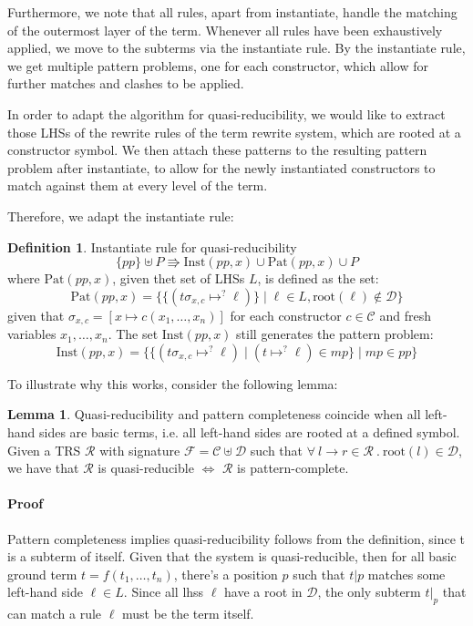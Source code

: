 \documentclass{report}
\theoremstyle{definition}
\newtheorem{lemma_inner}{Lemma}
\newenvironment{lemma}
  {\begin{customblock}\begin{lemma_inner}}
  {\end{lemma_inner}\end{customblock}}
\newtheorem{definition_inner}{Definition}
\newenvironment{definition}
  {\begin{customblock}\begin{definition_inner}}
  {\end{definition_inner}\end{customblock}}
\begin{document}
Furthermore, we note that all rules, apart from instantiate, handle the matching of the outermost layer of the term. Whenever all rules have been exhaustively applied, we move to the subterms via the instantiate rule. By the instantiate rule, we get multiple pattern problems, one for each constructor, which allow for further matches and clashes to be applied.

In order to adapt the algorithm for quasi-reducibility, we would like to extract those LHSs of the rewrite rules of the term rewrite system, which are rooted at a constructor symbol. We then attach these patterns to the resulting pattern problem after instantiate, to allow for the newly instantiated constructors to match against them at every level of the term.

Therefore, we adapt the instantiate rule:

\begin{definition}\label{def:quasi-instantiate}
Instantiate rule for quasi-reducibility
$$\{pp\} \uplus P \Rrightarrow \text{Inst}(pp, x) \cup \text{Pat}(pp, x) \cup P$$
where $\text{Pat}(pp, x)$, given thet set of LHSs $L$, is defined as the set:
$$\text{Pat}(pp, x) = \{ \{(t\sigma_{x,c}\mapsto^? \ell)\} \mid \ell \in L, \text{root}(\ell) \not\in \mathcal{D}\}$$
given that $\sigma_{x,c} = [x \mapsto c(x_1, \dots, x_n)]$ for each constructor $c \in \mathcal{C}$ and fresh variables $x_1, \dots, x_n$.
The set $\text{Inst}(pp, x)$ still generates the pattern problem:
$$\text{Inst}(pp, x) = \{ \{ (t\sigma_{x,c}\mapsto^? \ell) \mid (t\mapsto^? \ell) \in mp \} \mid mp \in pp\}$$
\end{definition}

To illustrate why this works, consider the following lemma:

\begin{lemma}\label{lemma:quasi-pat-coincide} Quasi-reducibility and pattern completeness coincide when all left-hand sides are basic terms, i.e. all left-hand sides are rooted at a defined symbol. Given a TRS $\mathcal{R}$ with signature $\mathcal{F} = \mathcal{C} \uplus \mathcal{D}$ such that $\forall\ l \rightarrow r \in \mathcal{R}\ .\ \text{root}(l) \in \mathcal{D}$, we have that $\mathcal{R}$ is quasi-reducible $\iff$ $\mathcal{R}$ is pattern-complete.

\paragraph{Proof} Pattern completeness implies quasi-reducibility follows from the definition, since t is a subterm of itself. Given that the system is quasi-reducible, then for all basic ground term $t = f(t_1,\dots,t_n)$, there's a position $p$ such that $t|p$ matches some left-hand side $\ell \in L$. Since all lhss $\ell$ have a root in $\mathcal{D}$, the only subterm $t|_p$ that can match a rule $\ell$ must be the term itself.
\end{lemma}
\end{document}
